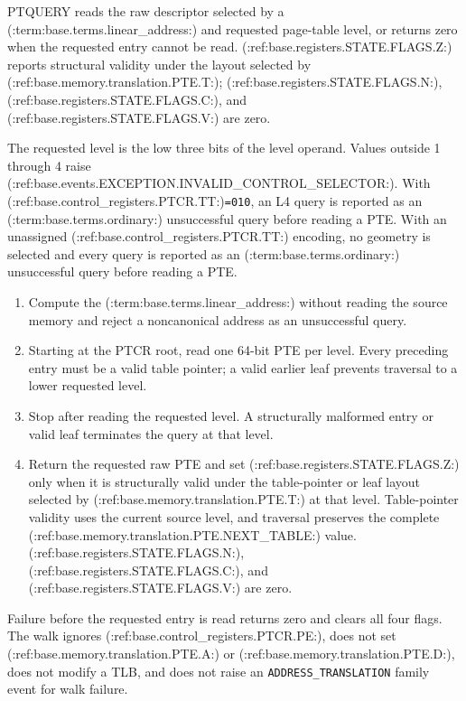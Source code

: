 PTQUERY reads the raw descriptor selected by a (:term:base.terms.linear_address:) and requested page-table level, or returns zero when the requested entry cannot be read. (:ref:base.registers.STATE.FLAGS.Z:) reports structural validity under the layout selected by (:ref:base.memory.translation.PTE.T:); (:ref:base.registers.STATE.FLAGS.N:), (:ref:base.registers.STATE.FLAGS.C:), and (:ref:base.registers.STATE.FLAGS.V:) are zero.

The requested level is the low three bits of the level operand. Values outside 1 through 4 raise (:ref:base.events.EXCEPTION.INVALID_CONTROL_SELECTOR:).
With (:ref:base.control_registers.PTCR.TT:)\texttt{=010}, an L4 query is reported as an (:term:base.terms.ordinary:) unsuccessful query before reading a PTE.
With an unassigned (:ref:base.control_registers.PTCR.TT:) encoding, no geometry is selected and every query is reported as an (:term:base.terms.ordinary:)
unsuccessful query before reading a PTE.

\begin{enumerate}
\item Compute the (:term:base.terms.linear_address:) without reading the source memory and reject a noncanonical address as an unsuccessful query.
\item Starting at the PTCR root, read one 64-bit PTE per level. Every preceding entry must be a valid table pointer; a valid earlier leaf prevents traversal to a lower requested level.
\item Stop after reading the requested level. A structurally malformed entry or valid leaf terminates the query at that level.
\item Return the requested raw PTE and set (:ref:base.registers.STATE.FLAGS.Z:) only when it is structurally valid under the table-pointer or leaf layout selected by (:ref:base.memory.translation.PTE.T:) at that level. Table-pointer validity uses the current source level, and traversal preserves the complete (:ref:base.memory.translation.PTE.NEXT_TABLE:) value. (:ref:base.registers.STATE.FLAGS.N:), (:ref:base.registers.STATE.FLAGS.C:), and (:ref:base.registers.STATE.FLAGS.V:) are zero.
\end{enumerate}
Failure before the requested entry is read returns zero and clears all four flags. The walk ignores (:ref:base.control_registers.PTCR.PE:), does not set (:ref:base.memory.translation.PTE.A:) or (:ref:base.memory.translation.PTE.D:), does not modify a TLB, and does not raise an \texttt{ADDRESS\_TRANSLATION} family event for walk failure.
